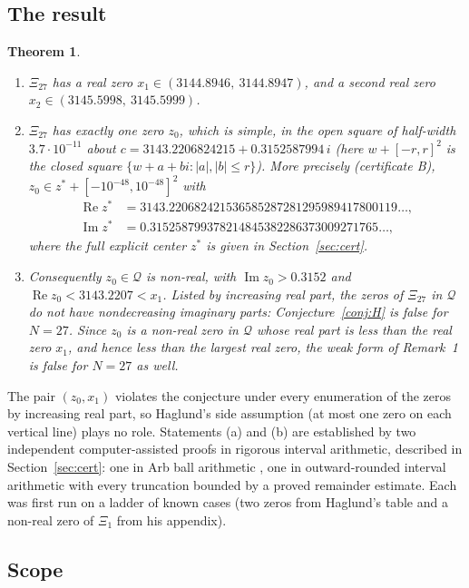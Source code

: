 \documentclass[11pt]{article}
\theoremstyle{plain}
\newtheorem{theorem}{Theorem}[section]
\theoremstyle{definition}
\theoremstyle{remark}
\newcommand{\Q}{\mathcal{Q}}
\newcommand{\re}{\operatorname{Re}}
\newcommand{\im}{\operatorname{Im}}
\begin{document}
\subsection{The result}

\begin{theorem}\label{thm:main}
\begin{enumerate}
\item[(a)] $\Xi_{27}$ has a real zero $x_1 \in (3144.8946,\ 3144.8947)$, and a
second real zero $x_2 \in (3145.5998,\ 3145.5999)$.
\item[(b)] $\Xi_{27}$ has exactly one zero $z_0$, which is simple, in the open
square of half-width $3.7\cdot 10^{-11}$ about
$c = 3143.2206824215 + 0.3152587994\,i$ (here $w + [-r, r]^2$ is the closed square
$\{w + a + bi : |a|, |b| \le r\}$). More precisely (certificate B),
$z_0 \in z^* + [-10^{-48}, 10^{-48}]^2$ with
\begin{align*}
\re z^* &= 3143.220682421536585287281295989417800119\ldots,\\
\im z^* &= 0.315258799378214845382286373009271765\ldots,
\end{align*}
where the full explicit center $z^*$ is given in Section~\ref{sec:cert}.
\item[(c)] Consequently $z_0 \in \Q$ is non-real, with $\im z_0 > 0.3152$ and
$\re z_0 < 3143.2207 < x_1$. Listed by increasing real part, the zeros of
$\Xi_{27}$ in $\Q$ do not have nondecreasing imaginary parts: Conjecture~\ref{conj:H}
is false for $N = 27$. Since $z_0$ is a non-real zero in $\Q$ whose real part is
less than the real zero $x_1$, and hence less than the largest real zero, the
weak form of Remark~1 is false for $N = 27$ as well.
\end{enumerate}
\end{theorem}

The pair $(z_0, x_1)$ violates the conjecture under every enumeration of the
zeros by increasing real part, so Haglund's side assumption (at most one zero on
each vertical line) plays no role. Statements (a) and (b) are established by two
independent computer-assisted proofs in rigorous interval arithmetic, described
in Section~\ref{sec:cert}: one in Arb ball arithmetic \cite{Arb, FLINT}, one in
outward-rounded interval arithmetic \cite{mpmath} with every truncation bounded
by a proved remainder estimate. Each was first run on a ladder of known cases
(two zeros from Haglund's table and a non-real zero of $\Xi_1$ from his
appendix).

\subsection{Scope}
\end{document}
